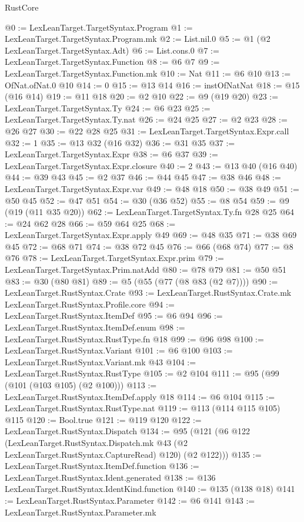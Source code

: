 \begin{lexlean}{RustCore}
\begin{coremodule}
@0 := LexLeanTarget.TargetSyntax.Program
@1 := LexLeanTarget.TargetSyntax.Program.mk
@2 := List.nil.{0}
@5 := @1 (@2 LexLeanTarget.TargetSyntax.Adt)
@6 := List.cons.{0}
@7 := LexLeanTarget.TargetSyntax.Function
@8 := @6 @7
@9 := LexLeanTarget.TargetSyntax.Function.mk
@10 := Nat
@11 := @6 @10
@13 := OfNat.ofNat.{0} @10
@14 := 0
@15 := @13 @14
@16 := instOfNatNat
@18 := @15 (@16 @14)
@19 := @11 @18
@20 := @2 @10
@22 := @9 (@19 @20)
@23 := LexLeanTarget.TargetSyntax.Ty
@24 := @6 @23
@25 := LexLeanTarget.TargetSyntax.Ty.nat
@26 := @24 @25
@27 := @2 @23
@28 := @26 @27
@30 := @22 @28 @25
@31 := LexLeanTarget.TargetSyntax.Expr.call
@32 := 1
@35 := @13 @32 (@16 @32)
@36 := @31 @35
@37 := LexLeanTarget.TargetSyntax.Expr
@38 := @6 @37
@39 := LexLeanTarget.TargetSyntax.Expr.closure
@40 := 2
@43 := @13 @40 (@16 @40)
@44 := @39 @43
@45 := @2 @37
@46 := @44 @45
@47 := @38 @46
@48 := LexLeanTarget.TargetSyntax.Expr.var
@49 := @48 @18
@50 := @38 @49
@51 := @50 @45
@52 := @47 @51
@54 := @30 (@36 @52)
@55 := @8 @54
@59 := @9 (@19 (@11 @35 @20))
@62 := LexLeanTarget.TargetSyntax.Ty.fn @28 @25
@64 := @24 @62 @28
@66 := @59 @64 @25
@68 := LexLeanTarget.TargetSyntax.Expr.apply @49
@69 := @48 @35
@71 := @38 @69 @45
@72 := @68 @71
@74 := @38 @72 @45
@76 := @66 (@68 @74)
@77 := @8 @76
@78 := LexLeanTarget.TargetSyntax.Expr.prim
@79 := LexLeanTarget.TargetSyntax.Prim.natAdd
@80 := @78 @79
@81 := @50 @51
@83 := @30 (@80 @81)
@89 := @5 (@55 (@77 (@8 @83 (@2 @7))))
@90 := LexLeanTarget.RustSyntax.Crate
@93 := LexLeanTarget.RustSyntax.Crate.mk LexLeanTarget.RustSyntax.Profile.core
@94 := LexLeanTarget.RustSyntax.ItemDef
@95 := @6 @94
@96 := LexLeanTarget.RustSyntax.ItemDef.enum
@98 := LexLeanTarget.RustSyntax.RustType.fn @18
@99 := @96 @98
@100 := LexLeanTarget.RustSyntax.Variant
@101 := @6 @100
@103 := LexLeanTarget.RustSyntax.Variant.mk @43
@104 := LexLeanTarget.RustSyntax.RustType
@105 := @2 @104
@111 := @95 (@99 (@101 (@103 @105) (@2 @100)))
@113 := LexLeanTarget.RustSyntax.ItemDef.apply @18
@114 := @6 @104
@115 := LexLeanTarget.RustSyntax.RustType.nat
@119 := @113 (@114 @115 @105) @115
@120 := Bool.true
@121 := @119 @120
@122 := LexLeanTarget.RustSyntax.Dispatch
@134 := @95
    (@121
      (@6
        @122
        (LexLeanTarget.RustSyntax.Dispatch.mk @43 (@2 LexLeanTarget.RustSyntax.CaptureRead) @120)
        (@2 @122)))
@135 := LexLeanTarget.RustSyntax.ItemDef.function
@136 := LexLeanTarget.RustSyntax.Ident.generated
@138 := @136 LexLeanTarget.RustSyntax.IdentKind.function
@140 := @135 (@138 @18)
@141 := LexLeanTarget.RustSyntax.Parameter
@142 := @6 @141
@143 := LexLeanTarget.RustSyntax.Parameter.mk

\end{coremodule}
\end{lexlean}
